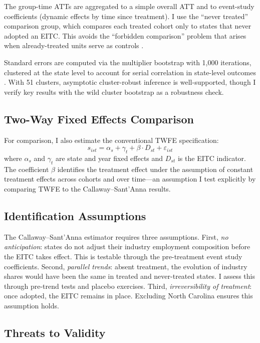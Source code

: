 \documentclass[12pt]{article}
\begin{document}
The group-time ATTs are aggregated to a simple overall ATT and to event-study coefficients (dynamic effects by time since treatment). I use the ``never treated'' comparison group, which compares each treated cohort only to states that never adopted an EITC. This avoids the ``forbidden comparison'' problem that arises when already-treated units serve as controls \citep{goodman2021, borusyak2024}.

Standard errors are computed via the multiplier bootstrap with 1,000 iterations, clustered at the state level to account for serial correlation in state-level outcomes \citep{bertrand2004}. With 51 clusters, asymptotic cluster-robust inference is well-supported, though I verify key results with the wild cluster bootstrap as a robustness check.

\subsection{Two-Way Fixed Effects Comparison}

For comparison, I also estimate the conventional TWFE specification:
\begin{equation}
s_{ist} = \alpha_s + \gamma_t + \beta \cdot D_{st} + \varepsilon_{ist}
\label{eq:twfe}
\end{equation}
where $\alpha_s$ and $\gamma_t$ are state and year fixed effects and $D_{st}$ is the EITC indicator. The coefficient $\beta$ identifies the treatment effect under the assumption of constant treatment effects across cohorts and over time---an assumption I test explicitly by comparing TWFE to the Callaway--Sant'Anna results.

\subsection{Identification Assumptions}

The Callaway--Sant'Anna estimator requires three assumptions. First, \textit{no anticipation}: states do not adjust their industry employment composition before the EITC takes effect. This is testable through the pre-treatment event study coefficients. Second, \textit{parallel trends}: absent treatment, the evolution of industry shares would have been the same in treated and never-treated states. I assess this through pre-trend tests and placebo exercises. Third, \textit{irreversibility of treatment}: once adopted, the EITC remains in place. Excluding North Carolina ensures this assumption holds.

\subsection{Threats to Validity}
\end{document}
